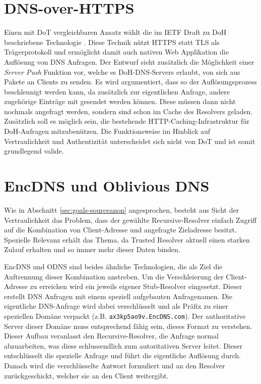 \section{DNS-over-HTTPS}
Einen mit DoT vergleichbaren Ansatz wählt die im IETF Draft zu \ac{DoH} beschriebene Technologie \cite{Mcmanus2018}. Diese Technik nützt HTTPS statt TLS als Trägerprotokoll und ermöglicht damit auch nativen Web Applikation die Auflösung von DNS Anfragen. Der Entwurf sieht zusätzlich die Möglichkeit einer \textit{Server Push} Funktion vor, welche es \ac{DoH}-DNS-Servers erlaubt, von sich aus Pakete an Clients zu senden. Es wird argumentiert, dass so der Auflösungsprozess beschleunigt werden kann, da zusätzlich zur eigentlichen Anfrage, andere zugehörige Einträge mit gesendet werden können. Diese müssen dann nicht nochmals angefragt werden, sondern sind schon im Cache des Resolvers geladen. Zusätzlich soll es möglich sein, die bestehende HTTP-Caching-Infrastruktur für DoH-Anfragen mitzubenützen. Die Funktionsweise im Hinblick auf Vertraulichkeit und Authentizität unterscheidet sich nicht von DoT und ist somit grundlegend valide. 

\section{EncDNS und Oblivious DNS}
\label{tec:encdns-odns}
Wie in Abschnitt \ref{sec:goals-sourceanon} angesprochen, besteht aus Sicht der Vertraulichkeit das Problem, dass der gewählte Recursive-Resolver einfach Zugriff auf die Kombination von Client-Adresse und angefragte Zieladresse besitzt. Spezielle Relevanz erhält das Thema, da Trusted Resolver aktuell einen starken Zulauf erhalten und so immer mehr dieser Daten binden.

EncDNS\cite{Herrmann2014} und \ac{ODNS}\cite{Schmitt2018} sind beides ähnliche Technologien, die als Ziel die Auftrennung dieser Kombination anstreben. Um die Verschleierung der Client-Adresse zu erreichen wird ein jeweils eigener Stub-Resolver eingesetzt. Dieser erstellt DNS Anfragen mit einem speziell aufgebauten Anfragenamen. Die eigentliche DNS-Anfrage wird dabei verschlüsselt und als Präfix zu einer speziellen Domäne verpackt (z.B. \texttt{ax3kp5ao9v.EncDNS.com}). Der authoritative Server dieser Domäne muss entsprechend fähig sein, dieses Format zu verstehen. Dieser Aufbau veranlasst den Recursive-Resolver, die Anfrage normal abzuarbeiten, was diese schlussendlich zum autoritativen Server leitet. Dieser entschlüsselt die spezielle Anfrage und führt die eigentliche Auflösung durch. Danach wird die verschlüsselte Antwort formuliert und an den Resolver zurückgeschickt, welcher sie an den Client weitergibt.

